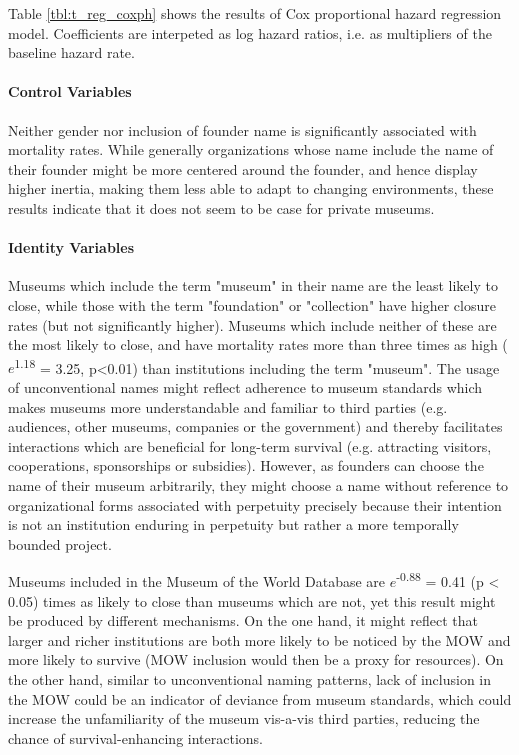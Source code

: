 \documentclass[12pt]{article}
\begin{document}
Table \ref{tbl:t_reg_coxph} shows the results of Cox proportional hazard regression model.
Coefficients are interpeted as log hazard ratios, i.e. as multipliers of the baseline hazard rate.
\paragraph*{Control Variables}


Neither gender nor inclusion of founder name is significantly associated with mortality rates.
While generally organizations whose name include the name of their founder might be more centered around the founder, and hence display higher inertia, making them less able to adapt to changing environments, these results indicate that it does not seem to be case for private museums.
\paragraph*{Identity Variables}


Museums which include the term "museum" in their name are the least likely to close, while those with the term "foundation" or "collection" have higher closure rates (but not significantly higher).
Museums which include neither of these are the most likely to close, and have mortality rates more than three times as high (\(e\)\textsuperscript{1.18} = 3.25, p<0.01) than institutions including the term "museum".
The usage of unconventional names might reflect adherence to museum standards which makes museums more understandable and familiar to third parties (e.g. audiences, other museums, companies or the government) and thereby facilitates interactions which are beneficial for long-term survival (e.g. attracting visitors, cooperations, sponsorships or subsidies).
However, as founders can choose the name of their museum arbitrarily, they might choose a name without reference to organizational forms associated with perpetuity precisely because their intention is not an institution enduring in perpetuity but rather a more temporally bounded project.


Museums included in the Museum of the World Database are \(e\)\textsuperscript{-0.88} = 0.41 (p < 0.05) times as likely to close than museums which are not, yet this result might be produced by different mechanisms.
On the one hand, it might reflect that larger and richer institutions are both more likely to be noticed by the MOW and more likely to survive (MOW inclusion would then be a proxy for resources).
On the other hand, similar to unconventional naming patterns, lack of inclusion in the MOW could be an indicator of deviance from museum standards, which could increase the unfamiliarity of the museum vis-a-vis third parties, reducing the chance of survival-enhancing interactions.
\end{document}
